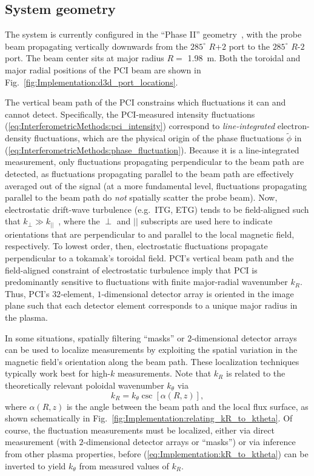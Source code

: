 \subsection{System geometry}
\label{sec:Implementation:PCI:geometry}
The system is currently configured
in the ``Phase II'' geometry~\cite{dorris_rsi09},
with the probe beam propagating vertically downwards
from the $285^{\circ}$ {$R$+$2$} port to the $285^{\circ}$ {$R$-$2$} port.
The beam center sits at major radius $R = $ \SI{1.98}{\meter}.
Both the toroidal and major radial positions
of the PCI beam are shown in
Fig.~\ref{fig:Implementation:d3d_port_locations}.

The vertical beam path of the PCI constrains
which fluctuations it can and cannot detect.
Specifically, the PCI-measured intensity fluctuations
(\ref{eq:InterferometricMethods:pci_intensity})
correspond to \emph{line-integrated} electron-density fluctuations, which
are the physical origin of the phase fluctuations $\tilde{\phi}$ in
(\ref{eq:InterferometricMethods:phase_fluctuation}).
Because it is a line-integrated measurement,
only fluctuations propagating perpendicular to the beam path are detected,
as fluctuations propagating parallel to the beam path
are effectively averaged out of the signal
(at a more fundamental level, fluctuations propagating
parallel to the beam path do \emph{not} spatially scatter the probe beam).
Now, electrostatic drift-wave turbulence (e.g.\ ITG, ETG)
tends to be field-aligned
such that $k_{\perp} \gg k_{||}$~\cite{horton_drift_waves, tynan_ppcf09},
where the $\perp$ and $||$ subscripts are used here to indicate
orientations that are perpendicular to and parallel to
the local magnetic field, respectively.
To lowest order, then, electrostatic fluctuations propagate
perpendicular to a tokamak's toroidal field.
PCI's vertical beam path and
the field-aligned constraint of electrostatic turbulence
imply that PCI is predominantly sensitive to fluctuations
with finite major-radial wavenumber $k_R$.
Thus, PCI's $32$-element, $1$-dimensional detector array
is oriented in the image plane such that
each detector element corresponds to a unique major radius in the plasma.

In some situations, spatially filtering ``masks''
\cite{dorris_rsi09, dorris_phd, lin_rsi06} or
$2$-dimensional detector arrays
\cite{sanin_rsi04, tanaka_rsi16}
can be used to localize measurements
by exploiting the spatial variation
in the magnetic field's orientation along the beam path.
These localization techniques typically work best
for high-$k$ measurements.
Note that $k_R$ is related to the
theoretically relevant poloidal wavenumber $k_{\theta}$ via
\begin{equation}
  k_R = k_{\theta} \csc[\alpha(R, z)],
  \label{eq:Implementation:kR_to_ktheta}
\end{equation}
where $\alpha(R, z)$ is the angle
between the beam path and the local flux surface,
as shown schematically in
Fig.~\ref{fig:Implementation:relating_kR_to_ktheta}.
Of course, the fluctuation measurements must be localized,
either via direct measurement
(with $2$-dimensional detector arrays or ``masks'')
or via inference from other plasma properties,
before (\ref{eq:Implementation:kR_to_ktheta})
can be inverted to yield $k_{\theta}$
from measured values of $k_R$.

